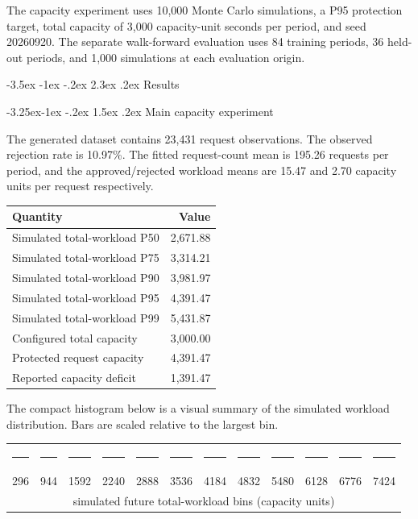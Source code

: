 \documentclass[11pt,a4paper]{article}
\makeatletter
\renewcommand\section{\@startsection{section}{1}{\z@}%
  {-3.5ex \@plus -1ex \@minus -.2ex}%
  {2.3ex \@plus .2ex}%
  {\normalfont\normalsize\bfseries\color{navy}}}
\renewcommand\subsection{\@startsection{subsection}{2}{\z@}%
  {-3.25ex\@plus -1ex \@minus -.2ex}%
  {1.5ex \@plus .2ex}%
  {\normalfont\normalsize\bfseries\color{bodyblue}}}
\makeatother
\begin{document}
The capacity experiment uses 10,000 Monte Carlo simulations, a P95 protection
target, total capacity of 3,000 capacity-unit seconds per period, and seed
20260920. The separate walk-forward evaluation uses 84 training periods, 36
held-out periods, and 1,000 simulations at each evaluation origin.

\section{Results}

\subsection{Main capacity experiment}

The generated dataset contains 23,431 request observations. The observed
rejection rate is 10.97\%. The fitted request-count mean is 195.26 requests
per period, and the approved/rejected workload means are 15.47 and 2.70
capacity units per request respectively.

\begin{center}
\begin{tabular}{lr}
\toprule
\textbf{Quantity} & \textbf{Value}\\
\midrule
Simulated total-workload P50 & 2,671.88\\
Simulated total-workload P75 & 3,314.21\\
Simulated total-workload P90 & 3,981.97\\
Simulated total-workload P95 & 4,391.47\\
Simulated total-workload P99 & 5,431.87\\
Configured total capacity & 3,000.00\\
Protected request capacity & 4,391.47\\
Reported capacity deficit & 1,391.47\\
\bottomrule
\end{tabular}
\end{center}

The compact histogram below is a visual summary of the simulated workload
distribution. Bars are scaled relative to the largest bin.

\begin{center}
\setlength{\tabcolsep}{2pt}
\begin{tabular}{c@{\quad}c@{\quad}c@{\quad}c@{\quad}c@{\quad}c@{\quad}c@{\quad}c@{\quad}c@{\quad}c@{\quad}c@{\quad}c}
\rule[-1mm]{6mm}{1mm}&\rule[-1mm]{6mm}{18mm}&\rule[-1mm]{6mm}{51mm}&\rule[-1mm]{6mm}{62mm}&\rule[-1mm]{6mm}{47mm}&\rule[-1mm]{6mm}{27mm}&\rule[-1mm]{6mm}{10mm}&\rule[-1mm]{6mm}{3mm}&\rule[-1mm]{6mm}{2mm}&\rule[-1mm]{6mm}{1mm}&\rule[-1mm]{6mm}{1mm}&\rule[-1mm]{6mm}{1mm}\\
296&944&1592&2240&2888&3536&4184&4832&5480&6128&6776&7424\\
\multicolumn{12}{c}{\normalsize simulated future total-workload bins (capacity units)}
\end{tabular}
\end{center}
\end{document}
